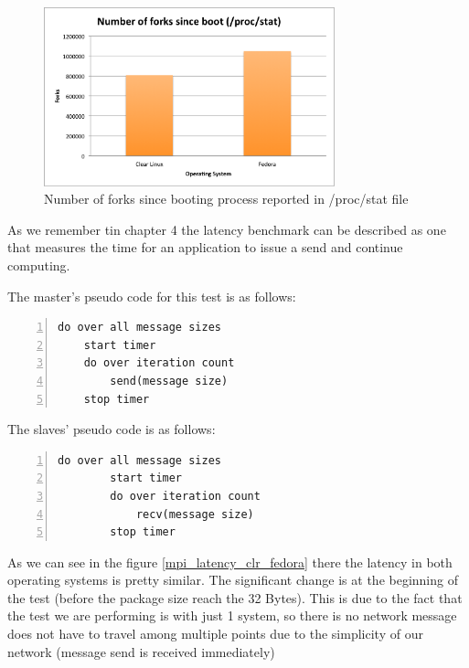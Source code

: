 \begin{figure}[H]
\centering
\includegraphics[width=0.75\textwidth]{images/number_forks.png}
\caption{Number of forks since booting process reported in /proc/stat file }
\label{number_forks_fedora_clr}
\end{figure}

As we remember tin chapter 4 the latency benchmark can be described as one that
measures the time for an application to issue a send and continue computing.

The master's pseudo code for this test is as follows:

\begin{minipage}{\textwidth}
\end{minipage}

\begin{minipage}{\textwidth}
\begin{lstlisting}[frame=single,numbers=left]
do over all message sizes 
    start timer
    do over iteration count 
        send(message size) 
    stop timer
\end{lstlisting}    

\end{minipage}

The slaves' pseudo code is as follows:

\begin{minipage}{\textwidth}
\end{minipage}

\begin{minipage}{\textwidth}
\begin{lstlisting}[frame=single,numbers=left]
   do over all message sizes 
        start timer
        do over iteration count 
            recv(message size) 
        stop timer
\end{lstlisting}

\end{minipage}

As we can see in the figure \ref{mpi_latency_clr_fedora} there the latency in
both operating systems is pretty similar. The significant change is at the
beginning of the test (before the package size reach the 32 Bytes). This is due
to the fact that the test we are performing is with just 1 system, so there is
no network message does not have to travel among multiple points due to the
simplicity of our network (message send is received immediately) 

